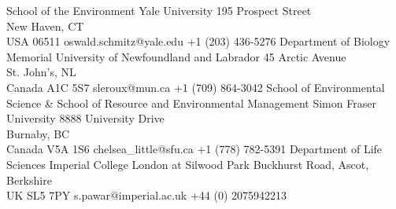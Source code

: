 

\cvdoublecolumn
{
  {School of the Environment}
  {Yale University}
  {195 Prospect Street\\
  New Haven, CT\\
  USA 06511}
  {oswald.schmitz@yale.edu}
  {+1 (203) 436-5276}
}
{
  {Department of Biology}
  {Memorial University of Newfoundland and Labrador}
  {45 Arctic Avenue\\
  St. John's, NL\\
  Canada A1C 5S7}
  {sleroux@mun.ca}
  {+1 (709) 864-3042}
}
{
  {School of Environmental Science \& School of Resource and Environmental Management}
  {Simon Fraser University}
  {8888 University Drive\\
  Burnaby, BC\\
  Canada V5A 1S6}
  {chelsea\_little@sfu.ca}
  {+1 (778) 782-5391}
}
{
  {Department of Life Sciences}
  {Imperial College London at Silwood Park}
  {Buckhurst Road, Ascot, Berkshire\\
  UK SL5 7PY}
  {s.pawar@imperial.ac.uk}
  {+44 (0) 2075942213}
}

